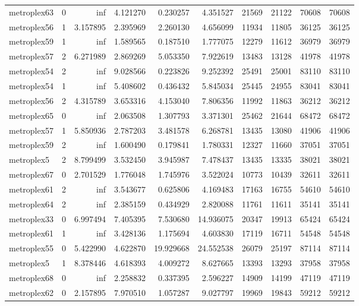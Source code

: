 \begin{longtable}{|l|r|r|r|r|r|r|r|r|r|}
metroplex63 & 0 & inf & 4.121270 & 0.230257 & 4.351527 & 21569 & 21122 & 70608 & 70608 \\
metroplex56 & 1 & 3.157895 & 2.395969 & 2.260130 & 4.656099 & 11934 & 11805 & 36125 & 36125 \\
metroplex59 & 1 & inf & 1.589565 & 0.187510 & 1.777075 & 12279 & 11612 & 36979 & 36979 \\
metroplex57 & 2 & 6.271989 & 2.869269 & 5.053350 & 7.922619 & 13483 & 13128 & 41978 & 41978 \\
metroplex54 & 2 & inf & 9.028566 & 0.223826 & 9.252392 & 25491 & 25001 & 83110 & 83110 \\
metroplex54 & 1 & inf & 5.408602 & 0.436432 & 5.845034 & 25445 & 24955 & 83041 & 83041 \\
metroplex56 & 2 & 4.315789 & 3.653316 & 4.153040 & 7.806356 & 11992 & 11863 & 36212 & 36212 \\
metroplex65 & 0 & inf & 2.063508 & 1.307793 & 3.371301 & 25462 & 21644 & 68472 & 68472 \\
metroplex57 & 1 & 5.850936 & 2.787203 & 3.481578 & 6.268781 & 13435 & 13080 & 41906 & 41906 \\
metroplex59 & 2 & inf & 1.600490 & 0.179841 & 1.780331 & 12327 & 11660 & 37051 & 37051 \\
metroplex5 & 2 & 8.799499 & 3.532450 & 3.945987 & 7.478437 & 13435 & 13335 & 38021 & 38021 \\
metroplex67 & 0 & 2.701529 & 1.776048 & 1.745976 & 3.522024 & 10773 & 10439 & 32611 & 32611 \\
metroplex61 & 2 & inf & 3.543677 & 0.625806 & 4.169483 & 17163 & 16755 & 54610 & 54610 \\
metroplex64 & 2 & inf & 2.385159 & 0.434929 & 2.820088 & 11761 & 11611 & 35141 & 35141 \\
metroplex33 & 0 & 6.997494 & 7.405395 & 7.530680 & 14.936075 & 20347 & 19913 & 65424 & 65424 \\
metroplex61 & 1 & inf & 3.428136 & 1.175694 & 4.603830 & 17119 & 16711 & 54548 & 54548 \\
metroplex55 & 0 & 5.422990 & 4.622870 & 19.929668 & 24.552538 & 26079 & 25197 & 87114 & 87114 \\
metroplex5 & 1 & 8.378446 & 4.618393 & 4.009272 & 8.627665 & 13393 & 13293 & 37958 & 37958 \\
metroplex68 & 0 & inf & 2.258832 & 0.337395 & 2.596227 & 14909 & 14199 & 47119 & 47119 \\
metroplex62 & 0 & 2.157895 & 7.970510 & 1.057287 & 9.027797 & 19969 & 19843 & 59212 & 59212 \\

\end{longtable}
